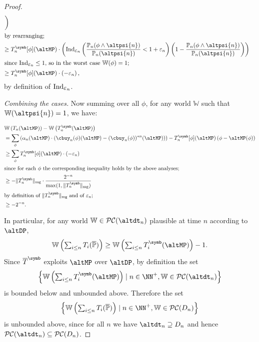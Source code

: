 \documentclass[authordate,onecolumn,noenvironments]{miri-tech-article}
\numberwithin{equation}{subsection}
\newcommand{\seq}[1]{{\overline{#1}}}
\newcommand{\nn}{n}
\newcommand{\trade}{T}%
\newcommand{\Trader}{\seq{\trade}} %
\newcommand{\magnit}[1]{{\|#1\|_{\rm mg}}} %
\newcommand{\BelState}{\mathbb{P}}
\newcommand{\pt}{\BelState}
\newcommand{\MP}{\seq{\pt}}
\newcommand{\dt}{D}
\newcommand{\pcworlds}{\mathcal{P\-C}}
\newcommand{\World}{\mathbb{W}}
\newcommand{\ctsind}[1]{\operatorname{Ind}_{\text{\small{${#1}$}}}} %
\begin{document}
\begin{proof}
\begin{align*}
 \bigg)\\
 \intertext{by rearranging;}
 \geq  &\; \trade^\symb_n[\phi](\altMP)\cdot \left(    
 \ctsind{\varepsilon_n}\left(\frac{\pt_n (\phi \wedge \altpsi{n})}{\pt_n(\altpsi{n}) }  < 1 + \varepsilon_n\right)
  \left(1- \frac{\pt_n (\phi \wedge \altpsi{n})}{\pt_n(\altpsi{n})}\right)  \right)
\\
 \intertext{since $\ctsind{\varepsilon_n}\leq 1,$ so in the worst case $\World(\phi) =1$;}
 \geq  &\; \trade^\symb_n[\phi](\altMP)\cdot \left(-  \varepsilon_n  \right),
\\
  \end{align*}
by definition of $\ctsind{\varepsilon_n}$. 


\textit{Combining the cases.} Now summing over all $\phi$,  for any world $\World$ such that $\World(\altpsi{n})=1$, we have:

\begin{align*}
&\World\left( \trade_n (\altMP)\right) - \World\left( \trade^\symb_n(\altMP) \right)\\
& = \sum_{\phi} \left( \alpha_n(\altMP) \cdot (\cbuy_n(\phi)(\altMP) - (\cbuy_\nn(\phi))^{* n}(\altMP) ) \right) - \trade^\symb_n[\phi](\altMP)\left(\phi -\altMP(\phi) \right) \\
& \geq \sum_{\phi}\trade^\symb_n[\phi](\altMP)\cdot \left(- \varepsilon_n  \right)\\
\intertext{since for each $\phi$ the corresponding inequality holds by the above analyses;}
& \geq -\magnit{\trade_n^\symb} \cdot \frac{2^{-n}}{\max(1,\magnit{\trade_n^\symb})}\\
\intertext{by definition of $\magnit{\trade_n^\symb}$ and of $\varepsilon_n$;}
& \geq -2^{-n}.
\end{align*}


   
 In particular,  for any world $\World \in \pcworlds(\altdt_n)$ plausible at time $n$ according to  $\altDP$, 
%
 \[ \World\left( {\textstyle \sum_{i \leq n} \trade_i(\MP) } \right) \geq  \World\left( {\textstyle \sum_{i \leq n} \trade^\symb_i(\altMP) } \right) -1. \]
%
Since $\Trader^\symb$ exploits $\altMP$ over $\altDP$, by definition the set
%
\[ \left\{    \World\left( {\textstyle \sum_{i \leq n} \trade^\symb_i(\altMP) } \right)  \mid   n \in \NN^+,   \World \in \pcworlds(\altdt_n) \right\} \]
%
is bounded below and unbounded above. Therefore the set 
%
\[ \left\{    \World\left( {\textstyle \sum_{i \leq n} \trade_i(\MP) } \right)  \mid   n \in \NN^+,   \World \in \pcworlds(\dt_n) \right\} \]
%
is unbounded above, since for all $n$ we have 
$\altdt_\nn \supseteq \dt_\nn$ and hence $ \pcworlds(\altdt_n) \subseteq \pcworlds(\dt_n) $. 


\end{proof}
\end{document}

